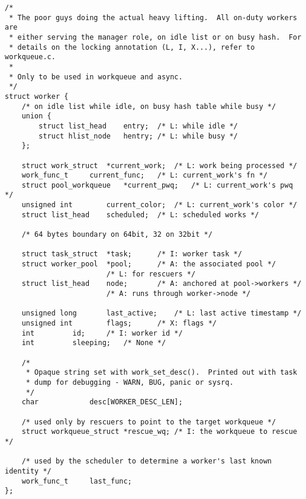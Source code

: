 
\begin{lstlisting}
/*
 * The poor guys doing the actual heavy lifting.  All on-duty workers are
 * either serving the manager role, on idle list or on busy hash.  For
 * details on the locking annotation (L, I, X...), refer to workqueue.c.
 *
 * Only to be used in workqueue and async.
 */
struct worker {
	/* on idle list while idle, on busy hash table while busy */
	union {
		struct list_head	entry;	/* L: while idle */
		struct hlist_node	hentry;	/* L: while busy */
	};

	struct work_struct	*current_work;	/* L: work being processed */
	work_func_t		current_func;	/* L: current_work's fn */
	struct pool_workqueue	*current_pwq;	/* L: current_work's pwq */
	unsigned int		current_color;	/* L: current_work's color */
	struct list_head	scheduled;	/* L: scheduled works */

	/* 64 bytes boundary on 64bit, 32 on 32bit */

	struct task_struct	*task;		/* I: worker task */
	struct worker_pool	*pool;		/* A: the associated pool */
						/* L: for rescuers */
	struct list_head	node;		/* A: anchored at pool->workers */
						/* A: runs through worker->node */

	unsigned long		last_active;	/* L: last active timestamp */
	unsigned int		flags;		/* X: flags */
	int			id;		/* I: worker id */
	int			sleeping;	/* None */

	/*
	 * Opaque string set with work_set_desc().  Printed out with task
	 * dump for debugging - WARN, BUG, panic or sysrq.
	 */
	char			desc[WORKER_DESC_LEN];

	/* used only by rescuers to point to the target workqueue */
	struct workqueue_struct	*rescue_wq;	/* I: the workqueue to rescue */

	/* used by the scheduler to determine a worker's last known identity */
	work_func_t		last_func;
};
\end{lstlisting}
